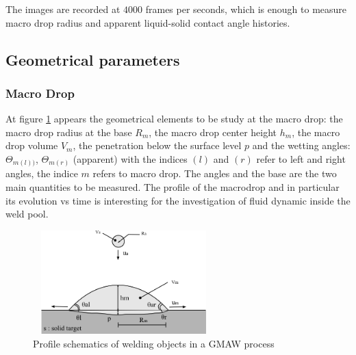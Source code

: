 \documentclass[12pt]{iopart}
\begin{document}
The images are recorded at $4000$ frames per seconds, which is enough to
measure macro drop radius and apparent liquid-solid contact angle histories. 

      
      
\subsection{Geometrical parameters}
\label{system_definitions}
\subsubsection{ Macro Drop}
\label{ macro_drop}


At figure \ref{schema-macro-drop-droplet-parameters} appears the geometrical 
elements to be study at the macro drop: the macro drop radius at the base $R_{m}$, 
the macro drop center height $h_{m}$, the macro drop volume $V_{m}$, the
penetration below the surface level $p$ and the wetting angles:
$\Theta_{m(l))}$, $\Theta_{m(r)}$ (apparent) 
with the indices $(l)$ and $(r)$ refer to left and
right angles, the indice  $m$ refers to macro drop.
The angles and the base are the two main quantities to be measured.
The profile of the macrodrop and in particular its evolution vs time is
interesting for the investigation of fluid dynamic inside the weld pool.

\begin{figure}
\begin{center}
\includegraphics[width=7cm,height=4cm]{images/schema-macro-drop-droplet-parameters.png}
\caption{{\small Profile schematics of welding objects in a GMAW process}}
\label{schema-macro-drop-droplet-parameters}
\end{center}
\end{figure}
    
\end{document}
